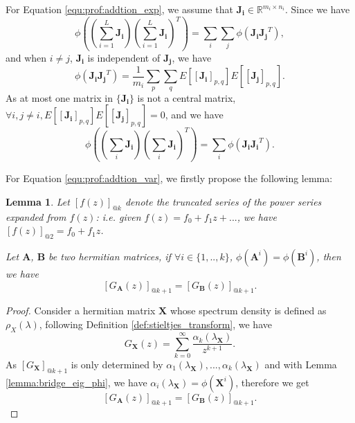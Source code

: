 \documentclass[10pt,journal,compsoc]{IEEEtran}
\newtheorem{lemma}[theorem]{Lemma}
\begin{document}
For Equation \eqref{equ:prof:addtion_exp}, we assume that $\mathbf{J_i}\in\mathbb{R}^{m_i\times n_i}$. Since we have
\begin{equation}
    \phi((\sum_{i=1}^L \mathbf{J_i})(\sum_{i=1}^L \mathbf{J_i})^T) = \sum_i\sum_j\phi(\mathbf{J_i}\mathbf{J_j}^T),
\end{equation}
and when $i\neq j$, $\mathbf{J_i}$ is independent of $\mathbf{J_j}$, we have
\begin{equation}
    \phi(\mathbf{J_iJ_j}^T) = \frac{1}{m_i}\sum_p\sum_qE\left[\left[\mathbf{J_i}\right]_{p,q}\right]E\left[\left[\mathbf{J_j}\right]_{p,q}\right].
\end{equation}
As at most one matrix in $\{\mathbf{J_i}\}$ is not a central matrix, $\forall i,j\neq i, E\left[\left[\mathbf{J_i}\right]_{p,q}\right]E\left[\left[\mathbf{J_j}\right]_{p,q}\right]=0$, and we have
\begin{equation}
    \phi((\sum_{i} \mathbf{J_i})(\sum_{i} \mathbf{J_i})^T)=\sum_i\phi(\mathbf{J_i}\mathbf{J_i}^T).
\end{equation}

For Equation \eqref{equ:prof:addtion_var}, we firstly propose the following lemma:
\begin{lemma}
Let $[f(z)]_{@k}$ denote the truncated series of the power series expanded from $f(z)$: i.e. given $f(z) = f_0 + f_1z+...$, we have $[f(z)]_{@2} = f_0 + f_1z$. 

Let $\mathbf{A}$, $\mathbf{B}$ be two hermitian matrices, if $\forall i\in\{1,..,k\}$, $\phi(\mathbf{A}^{i}) = \phi(\mathbf{B}^{i})$, then we have
\begin{equation}
    \left[G_{\mathbf{A}}(z)\right]_{@k+1} =  \left[G_{\mathbf{B}}(z)\right]_{@k+1}.
\end{equation}
\label{lemma:equivalent_G_transform}
\end{lemma}

\begin{proof}
Consider a hermitian matrix $\mathbf{X}$ whose spectrum density is defined as $\rho_{X}(\lambda)$, following Definition \ref{def:stieltjes_transform}, we have
\begin{equation}
    G_{\mathbf{X}}(z) = \sum_{k=0}^{\infty}\frac{\alpha_k(\lambda_{\mathbf{X}})}{z^{k+1}}.
\end{equation}
As $[G_{\mathbf{X}}]_{@k+1}$ is only determined by $\alpha_1(\lambda_{\mathbf{X}}),...,\alpha_k(\lambda_{\mathbf{X}})$ and with Lemma \ref{lemma:bridge_eig_phi}, we have $\alpha_i(\lambda_{\mathbf{X}})=\phi(\mathbf{X}^i)$, therefore we get
\begin{equation}
    \left[G_{\mathbf{A}}(z)\right]_{@k+1} =  \left[G_{\mathbf{B}}(z)\right]_{@k+1}.
\end{equation}
\end{proof}
\end{document}
